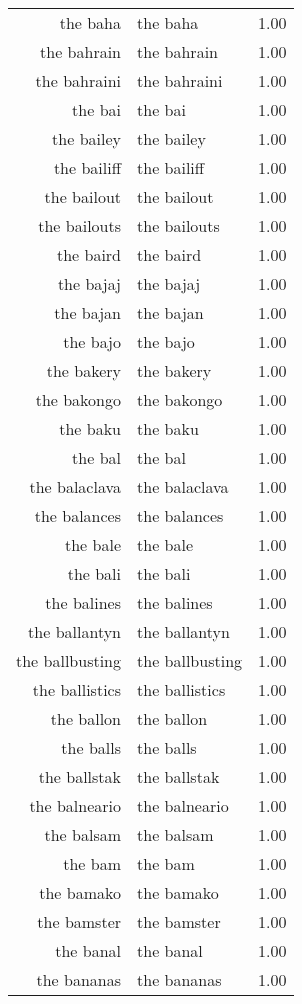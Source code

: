 \begin{table}[ht]
\begin{tabular}{rlr}
  the baha & the baha & 1.00 \\ 
  the bahrain & the bahrain & 1.00 \\ 
  the bahraini & the bahraini & 1.00 \\ 
  the bai & the bai & 1.00 \\ 
  the bailey & the bailey & 1.00 \\ 
  the bailiff & the bailiff & 1.00 \\ 
  the bailout & the bailout & 1.00 \\ 
  the bailouts & the bailouts & 1.00 \\ 
  the baird & the baird & 1.00 \\ 
  the bajaj & the bajaj & 1.00 \\ 
  the bajan & the bajan & 1.00 \\ 
  the bajo & the bajo & 1.00 \\ 
  the bakery & the bakery & 1.00 \\ 
  the bakongo & the bakongo & 1.00 \\ 
  the baku & the baku & 1.00 \\ 
  the bal & the bal & 1.00 \\ 
  the balaclava & the balaclava & 1.00 \\ 
  the balances & the balances & 1.00 \\ 
  the bale & the bale & 1.00 \\ 
  the bali & the bali & 1.00 \\ 
  the balines & the balines & 1.00 \\ 
  the ballantyn & the ballantyn & 1.00 \\ 
  the ballbusting & the ballbusting & 1.00 \\ 
  the ballistics & the ballistics & 1.00 \\ 
  the ballon & the ballon & 1.00 \\ 
  the balls & the balls & 1.00 \\ 
  the ballstak & the ballstak & 1.00 \\ 
  the balneario & the balneario & 1.00 \\ 
  the balsam & the balsam & 1.00 \\ 
  the bam & the bam & 1.00 \\ 
  the bamako & the bamako & 1.00 \\ 
  the bamster & the bamster & 1.00 \\ 
  the banal & the banal & 1.00 \\ 
  the bananas & the bananas & 1.00 \\ 

\end{tabular}
\end{table}
